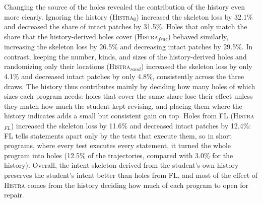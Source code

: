 \documentclass[10pt,conference]{IEEEtran}
\begin{document}
Changing the source of the holes revealed the contribution of the history even more clearly. Ignoring the history (\textsc{Histra}$_{\emptyset}$) increased the skeleton loss by 32.1\% and decreased the share of intact patches by 31.5\%. Holes that only match the share that the history-derived holes cover (\textsc{Histra}$_{\mathit{frac}}$) behaved similarly, increasing the skeleton loss by 26.5\% and decreasing intact patches by 29.5\%. In contrast, keeping the number, kinds, and sizes of the history-derived holes and randomizing only their locations (\textsc{Histra}$_{\mathit{rand}}$) increased the skeleton loss by only 4.1\% and decreased intact patches by only 4.8\%, consistently across the three draws. The history thus contributes mainly by deciding how many holes of which sizes each program needs: holes that cover the same share lose their effect unless they match how much the student kept revising, and placing them where the history indicates adds a small but consistent gain on top. Holes from FL (\textsc{Histra}$_{\mathit{FL}}$) increased the skeleton loss by 11.6\% and decreased intact patches by 12.4\%: FL tells statements apart only by the tests that execute them, so in short programs, where every test executes every statement, it turned the whole program into holes (12.5\% of the trajectories, compared with 3.0\% for the history). Overall, the intent skeleton derived from the student's own history preserves the student's intent better than holes from FL, and most of the effect of \textsc{Histra} comes from the history deciding how much of each program to open for repair.
\end{document}
